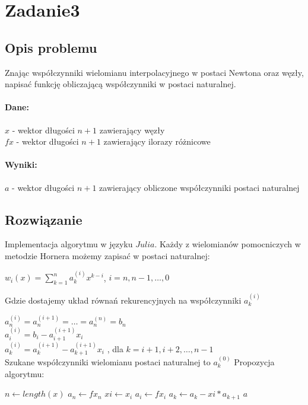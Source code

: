 \documentclass{article}
\begin{document}
\section{Zadanie3}
\subsection{Opis problemu}
Znając współczynniki wielomianu interpolacyjnego w postaci Newtona oraz węzły, napisać funkcję obliczającą współczynniki w postaci naturalnej.
\paragraph{Dane:}
\indent $x$ - wektor długości $n+1$ zawierający węzły\\
\indent $fx$ - wektor długości $n+1$ zawierający ilorazy różnicowe\\
\paragraph{Wyniki:}
\indent $a$ - wektor długości $n+1$ zawierający obliczone współczynniki postaci naturalnej\\
\subsection{Rozwiązanie}
Implementacja algorytmu w języku $Julia$.
Każdy z wielomianów pomocniczych w metodzie Hornera możemy zapisać w postaci naturalnej:
\begin{center}
	$w_i(x) = \sum\limits_{k=1}^n a_k^{(i)}x^{k-i}$, $i = n, n-1, \ldots, 0 $
\end{center}
Gdzie dostajemy układ równań rekurencyjnych na współczynniki $a_k^{(i)}$

	\indent $a_n^{(i)} = a_n^{(i+1)}=\ldots=a_n^{(n)} = b_n$\\
	\indent $a_i^{(i)}=b_i - a_{i+1}^{(i+1)}x_i$\\
	\indent $a_k^{(i)} = a_k^{(i+1)}-a_{k+1}^{(i+1)}x_i$ , dla $k = i+1, i+2, \ldots, n-1$\\
	Szukane współczynniki wielomianu postaci naturalnej to $a_k^{(0)}$
	Propozycja algorytmu:
	\begin{algorithm}[h!]
		\caption{$naturalna(x, fx)$}
		\begin{algorithmic}
			\STATE $n \leftarrow length(x)$
			\STATE $a_n \leftarrow fx_n$
			\STATE $xi \leftarrow x_i $
			\STATE $a_i \leftarrow fx_i$
			\STATE $a_k \leftarrow a_k - xi * a_{k+1}$
			\ENDFOR
			\ENDFOR
			\RETURN $a$
		\end{algorithmic}
	\end{algorithm}
\end{document}

